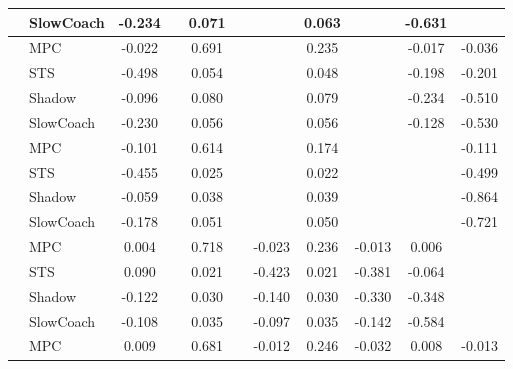 \begin{tabular}{|l|l|*{9}{c|}}
                                                           & SlowCoach &   -0.234 &        &     0.071 &     &     &  0.063 &      &  -0.631 &       \\
\midrule
[True, False, True, False, False, True, False, True, True] & MPC &   -0.022 &        &     0.691 &     &     &  0.235 &      &  -0.017 &   -0.036 \\
                                                           & STS &   -0.498 &        &     0.054 &     &     &  0.048 &      &  -0.198 &   -0.201 \\
                                                           & Shadow &   -0.096 &        &     0.080 &     &     &  0.079 &      &  -0.234 &   -0.510 \\
                                                           & SlowCoach &   -0.230 &        &     0.056 &     &     &  0.056 &      &  -0.128 &   -0.530 \\
\midrule
[True, False, True, False, False, True, False, False, True] & MPC &   -0.101 &        &     0.614 &     &     &  0.174 &      &      &   -0.111 \\
                                                           & STS &   -0.455 &        &     0.025 &     &     &  0.022 &      &      &   -0.499 \\
                                                           & Shadow &   -0.059 &        &     0.038 &     &     &  0.039 &      &      &   -0.864 \\
                                                           & SlowCoach &   -0.178 &        &     0.051 &     &     &  0.050 &      &      &   -0.721 \\
\midrule
[True, False, True, False, True, True, True, True, False] & MPC &    0.004 &        &     0.718 &     & -0.023 &  0.236 &  -0.013 &   0.006 &       \\
                                                           & STS &    0.090 &        &     0.021 &     & -0.423 &  0.021 &  -0.381 &  -0.064 &       \\
                                                           & Shadow &   -0.122 &        &     0.030 &     & -0.140 &  0.030 &  -0.330 &  -0.348 &       \\
                                                           & SlowCoach &   -0.108 &        &     0.035 &     & -0.097 &  0.035 &  -0.142 &  -0.584 &       \\
\midrule
[True, False, True, False, True, True, True, True, True] & MPC &    0.009 &        &     0.681 &     & -0.012 &  0.246 &  -0.032 &   0.008 &   -0.013 \\

\end{tabular}
